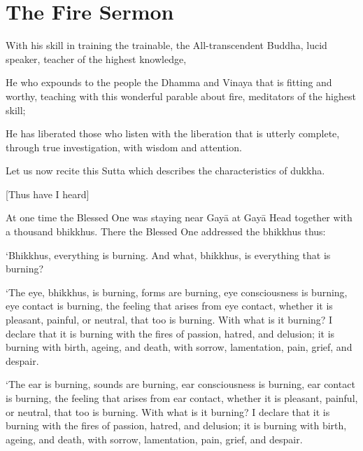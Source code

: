 \chapterTocDelegatePageNumber
\chapter{The Fire Sermon}%

\setTocDelegatedPageNumber
\englishText
\renewcommand{\englishTitle}{The Fire Sermon}

\begin{leader}

With his skill in training the trainable, the All-transcendent Buddha,
lucid speaker, teacher of the highest knowledge,

He who expounds to the people the Dhamma and Vinaya that is fitting and
worthy, teaching with this wonderful parable about fire, meditators of
the highest skill;

He has liberated those who listen with the liberation that is utterly
complete, through true investigation, with wisdom and attention.

Let us now recite this Sutta which describes the characteristics of
dukkha.

\end{leader}

[Thus have I heard]

At one time the Blessed One was staying near Gayā at Gayā Head together
with a thousand bhikkhus. There the Blessed One addressed the bhikkhus
thus:

‘Bhikkhus, everything is burning. And what, bhikkhus, is everything
that is burning?

‘The eye, bhikkhus, is burning, forms are burning, eye consciousness is
burning, eye contact is burning, the feeling that arises from eye
contact, whether it is pleasant, painful, or neutral, that too is
burning. With what is it burning? I declare that it is burning with the
fires of passion, hatred, and delusion; it is burning with birth,
ageing, and death, with sorrow, lamentation, pain, grief, and despair.

\enlargethispage{2\baselineskip}

‘The ear is burning, sounds are burning, ear consciousness is burning,
ear contact is burning, the feeling that arises from ear contact,
whether it is pleasant, painful, or neutral, that too is burning. With
what is it burning? I declare that it is burning with the fires of
passion, hatred, and delusion; it is burning with birth, ageing, and
death, with sorrow, lamentation, pain, grief, and despair.

